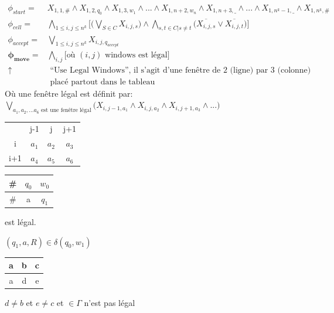 \documentclass[a4paper,12pt]{article}
\begin{document}
    \begin{align*}
      \phi_{start} =& X_{1, 1, \#} \wedge X_{1, 2, q_0} \wedge X_{1, 3, w_1} \wedge ... \wedge X_{1, n+2, w_n} \wedge X_{1, n+3, \_} \wedge ... \wedge X_{1, n^k-1, \_} \wedge X_{1, n^k, \#}\\
      \phi_{cell} =& \bigwedge\limits_{1 \leq i, j \leq n^k} \Big[ \big(\bigvee\limits_{S \in C} X_{i, j, s} \big) \wedge \bigwedge\limits_{s, t \in C | s \neq t} \big( \overline{X_{i, j, s}} \vee \overline{X_{i, j, t}} \big) \Big]\\
      \phi_{accept} =& \bigvee\limits_{1 \leq i, j \leq n^k} X_{i, j, q_{accept}}\\
      \mathbf{\phi_{move}} =& \bigwedge\limits_{i,j} \Big[\text{où }(i,j) \text{ windows est légal} \Big]\\
      \uparrow &\text{ ``Use Legal Windows'', il s'agit d'une fenêtre de 2 (ligne) par 3 (colonne)}\\
      &\text{ placé partout dans le tableau}
    \end{align*}
    Où une fenêtre légal est définit par:\\
    $\bigvee\limits_{a_1, a_2, ... a_6 \text{ est une fenêtre légal}} \big(X_{i, j-1, a_1} \wedge X_{i, j, a_2} \wedge X_{i, j+1, a_3} \wedge ... \big)$

    \begin{table}[h]
      \centering
      \begin{tabular}{cccc}
			      & j-1                       & j                         & j+1                       \\ \cline{2-4}
      \multicolumn{1}{c|}{i}   & \multicolumn{1}{c|}{$a_1$} & \multicolumn{1}{c|}{$a_2$} & \multicolumn{1}{c|}{$a_3$} \\ \cline{2-4}
      \multicolumn{1}{c|}{i+1} & \multicolumn{1}{c|}{$a_4$} & \multicolumn{1}{c|}{$a_5$} & \multicolumn{1}{c|}{$a_6$} \\ \cline{2-4}
      \end{tabular}
    \end{table}

    \begin{table}[h]
      \centering
      \begin{tabular}{|c|c|c|}
      \hline
      \# & $q_0$ & $w_0$ \\ \hline
      \# & a    & $q_1$ \\ \hline
      \end{tabular}
    \end{table}
    est légal.

    $(q_1, a, R) \in \delta(q_0, w_1)$

    \begin{table}[h]
      \centering
      \begin{tabular}{|c|c|c|}
      \hline
      a & b & c \\ \hline
      a & d & e \\ \hline
      \end{tabular}
    \end{table}
    $d \neq b$ et $e \neq c$ et $\in \Gamma$ n'est pas légal

\end{document}
